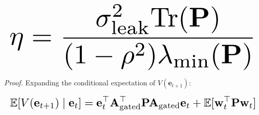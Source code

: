 \documentclass[10pt,journal,compsoc,twocolumn]{IEEEtran}
\begin{document}
\begin{equation}
\resizebox{\columnwidth}{!}{$\displaystyle
\begin{aligned}
\eta = \frac{\sigma_{\text{leak}}^2 \text{Tr}(\mathbf{P})}{(1 - \rho^2) \lambda_{\min}(\mathbf{P})}
\end{aligned}
$}
\end{equation}

























\textit{Proof.} Expanding the conditional expectation of $V(\mathbf{e}_{t+1})$:

























\begin{equation}
\resizebox{\columnwidth}{!}{$\displaystyle
\begin{aligned}
\mathbb{E}[V(\mathbf{e}_{t+1}) \mid \mathbf{e}_t] = \mathbf{e}_t^\top \mathbf{A}_{\text{gated}}^\top \mathbf{P} \mathbf{A}_{\text{gated}} \mathbf{e}_t + \mathbb{E}[\mathbf{w}_t^\top \mathbf{P} \mathbf{w}_t]
\end{aligned}
$}
\end{equation}
\end{document}
